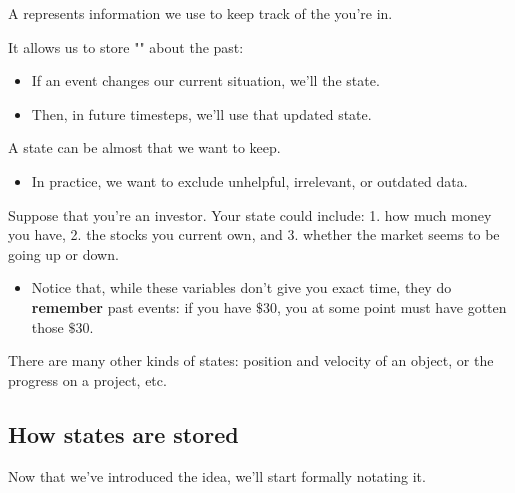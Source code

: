         \begin{definition}
            A  represents information we use to keep track of the  you're in.
            
            It allows us to store "" about the past:

            \begin{itemize}
                \item If an event changes our current situation, we'll  the state.
                \item Then, in future timesteps, we'll use that updated state.
            \end{itemize}

            \subsecdiv
            
            A state can be almost  that we want to keep.

            \begin{itemize}
                \item In practice, we want to exclude unhelpful, irrelevant, or outdated data.
            \end{itemize}
        \end{definition}

        \miniex Suppose that you're an investor. Your state could include: 1. how much money you have, 2. the stocks you current own, and 3. whether the market seems to be going up or down.

        \begin{itemize}
            \item Notice that, while these variables don't give you exact time, they do \textbf{remember} past events: if you have $\$30$, you at some point must have gotten those $\$30$.
        \end{itemize}
        
        There are many other kinds of states: position and velocity of an object, or the progress on a project, etc.

    \subsection{How states are stored}

        Now that we've introduced the idea, we'll start formally notating it.\\

